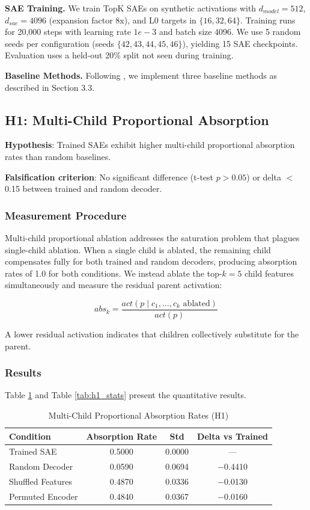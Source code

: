 \documentclass{article}
\begin{document}
\textbf{SAE Training.} We train TopK SAEs on synthetic activations with $d_{model}=512$, $d_{sae}=4096$ (expansion factor 8x), and L0 targets in $\{16, 32, 64\}$. Training runs for 20,000 steps with learning rate $1e-3$ and batch size 4096. We use 5 random seeds per configuration (seeds $\{42, 43, 44, 45, 46\}$), yielding 15 SAE checkpoints. Evaluation uses a held-out 20\% split not seen during training.

\textbf{Baseline Methods.} Following \citet{korznikov2026}, we implement three baseline methods as described in Section 3.3.

\subsection{H1: Multi-Child Proportional Absorption}

\textbf{Hypothesis}: Trained SAEs exhibit higher multi-child proportional absorption rates than random baselines.

\textbf{Falsification criterion}: No significant difference (t-test $p > 0.05$) or delta $<$ 0.15 between trained and random decoder.

\subsubsection{Measurement Procedure}

Multi-child proportional ablation addresses the saturation problem that plagues single-child ablation. When a single child is ablated, the remaining child compensates fully for both trained and random decoders, producing absorption rates of 1.0 for both conditions. We instead ablate the top-$k=5$ child features simultaneously and measure the residual parent activation:

\begin{equation}
abs_k = \frac{act(p \mid c_1, \ldots, c_k \text{ ablated})}{act(p)}
\end{equation}

A lower residual activation indicates that children collectively substitute for the parent.

\subsubsection{Results}

Table \ref{tab:h1_main} and Table \ref{tab:h1_stats} present the quantitative results.

\begin{table}[t]
\caption{Multi-Child Proportional Absorption Rates (H1)}
\label{tab:h1_main}
\centering
\begin{tabular}{lccc}
\toprule
Condition & Absorption Rate & Std & Delta vs Trained \\
\midrule
Trained SAE & 0.5000 & 0.0000 & --- \\
Random Decoder & 0.0590 & 0.0694 & $-$0.4410 \\
Shuffled Features & 0.4870 & 0.0336 & $-$0.0130 \\
Permuted Encoder & 0.4840 & 0.0367 & $-$0.0160 \\
\bottomrule
\end{tabular}
\end{table}
\end{document}
